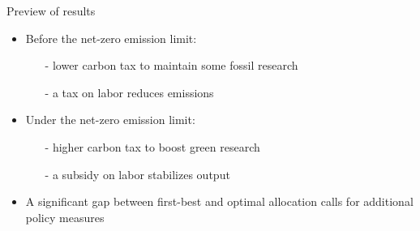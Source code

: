 \documentclass[11pt,aspectratio=169]{beamer}
\newcommand{\tr}[1]{\textcolor{blue}{#1}}
\begin{document}
\begin{frame}{Preview of results}
	\vspace{-3mm}
	\pause
	\begin{itemize}[<+-| alert@+>]
		\item Before the net-zero emission limit: 
		\begin{itemize}
			\item[-] lower carbon tax to maintain some fossil research %
			\item[-] a tax on labor reduces emissions
		\end{itemize}
		\vspace{3mm}
		\item Under the net-zero emission limit: 
		\begin{itemize}
			\item[-]  higher carbon tax to boost green research
			\item[-]  a subsidy on labor stabilizes output
		\end{itemize}
		\vspace{3mm}
		\item A significant gap between first-best and optimal allocation calls for additional policy measures
\end{itemize}
\end{frame}
\end{document}
